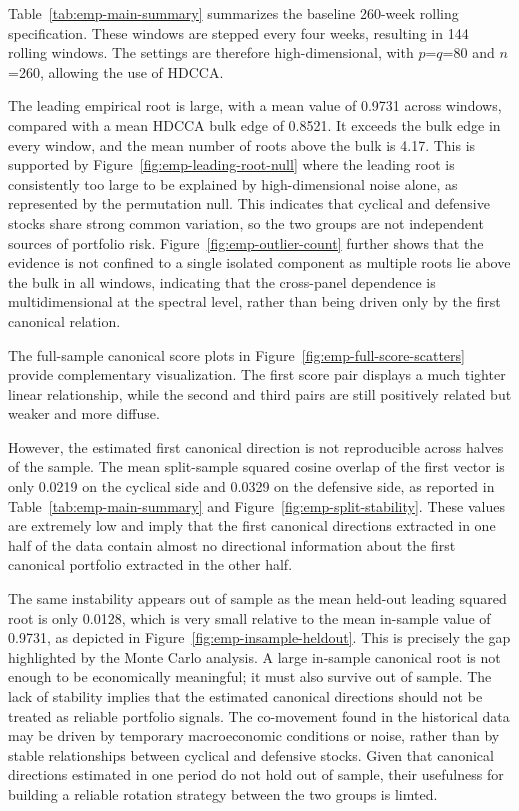 \documentclass[12pt]{report} %
\begin{document}
Table~\ref{tab:emp-main-summary} summarizes the baseline 260-week rolling specification. These windows are
stepped every four weeks, resulting in 144 rolling windows. The settings are therefore high-dimensional,
with $p$=$q$=80 and $n$=260, allowing the use of HDCCA. 

The leading empirical root is large, with a mean value of 0.9731 across windows, compared with a 
mean HDCCA bulk edge of 0.8521. It exceeds the bulk edge in every window, and the 
mean number of roots above the bulk is 4.17. This is supported by Figure~\ref{fig:emp-leading-root-null}
where the leading root is consistently too large to be explained
by high-dimensional noise alone, as represented by the permutation null. 
This indicates that cyclical and defensive stocks share strong common variation, so the 
two groups are not independent sources of portfolio risk. Figure~\ref{fig:emp-outlier-count} 
further shows that the evidence is not confined to a single isolated component as multiple roots lie 
above the bulk in all windows, indicating that the cross-panel dependence is multidimensional 
at the spectral level, rather than being driven only by the first canonical relation.

The full-sample canonical score plots in Figure~\ref{fig:emp-full-score-scatters} provide 
complementary visualization. The first score pair displays a much tighter linear 
relationship, while the second and third pairs are still 
positively related but weaker and more diffuse.

However, the estimated first canonical direction is not reproducible across halves of the sample. 
The mean split-sample squared cosine overlap of the first vector is only 0.0219 on the cyclical side and 
0.0329 on the defensive side, as reported in Table~\ref{tab:emp-main-summary} and 
Figure~\ref{fig:emp-split-stability}. These values are extremely low and imply that the first canonical 
directions extracted in one half of the data contain almost no directional information about the first 
canonical portfolio extracted in the other half.

The same instability appears out of sample as the mean held-out leading squared root is only 0.0128, 
which is very small relative to the mean in-sample value of 0.9731, as depicted in Figure~\ref{fig:emp-insample-heldout}.
This is precisely the gap highlighted by the Monte Carlo analysis. A large in-sample canonical root is not enough
to be economically meaningful; it must also survive out of sample.
The lack of stability implies that the estimated canonical directions should not be treated 
as reliable portfolio signals. The co-movement found in the historical data may be driven 
by temporary macroeconomic conditions or noise, rather than by stable relationships 
between cyclical and defensive stocks. Given that canonical directions estimated in one 
period do not hold out of sample, their usefulness for building a reliable rotation 
strategy between the two groups is limted.
\end{document}
